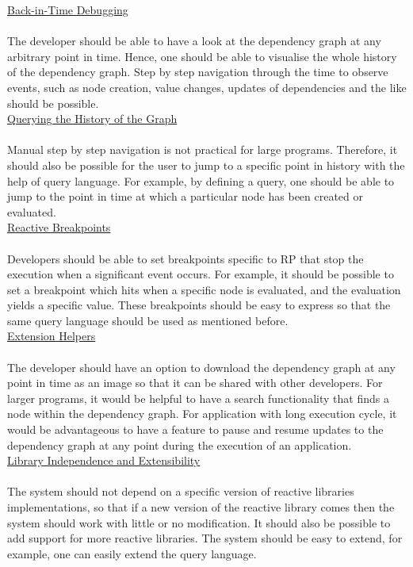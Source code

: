 \underline{Back-in-Time Debugging}\\
\\
The developer should be able to have a look at the dependency graph at any arbitrary point in time. Hence, one should be able to visualise the whole history of the dependency graph. Step by step navigation through the time to observe events, such as node creation, value changes, updates of dependencies and the like should be possible. \\


\underline{Querying the History of the Graph}\\
\\
Manual step by step navigation is not practical for large programs. Therefore, it should also be possible for the user to jump to a specific point in history with the help of query language.
For example, by defining a query, one should be able to jump to the point in time at which a particular node has been created or evaluated.\\


\underline{Reactive Breakpoints}\\
\\
Developers should be able to set breakpoints specific to RP that stop the execution when a significant event occurs. For example, it should be possible to set a breakpoint which hits when a specific node is evaluated, and the evaluation yields a specific value. These breakpoints should be easy to express so that the same query language should be used as mentioned before.\\


\underline{Extension Helpers}\\
\\
The developer should have an option to download the dependency graph at any point in time as an image so that it can be shared with other developers. For larger programs, it would be helpful to have a search functionality that finds a node within the dependency graph. For application with long execution cycle, it would be advantageous to have a feature to pause and resume updates to the dependency graph at any point during the execution of an application. \\


\underline{Library Independence and Extensibility}\\
\\
The system should not depend on a specific version of reactive libraries implementations, so that if a new version of the reactive library comes then the system should work with little or no modification. It should also be possible to add support for more reactive libraries. The system should be easy to extend, for example, one can easily extend the query language.




